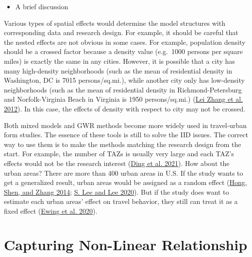 \documentclass[
  11pt,
  openany]{memoir}
\providecommand{\tightlist}{%
  \setlength{\itemsep}{0pt}\setlength{\parskip}{0pt}}
\begin{document}
\begin{itemize}
\tightlist
\item
  A brief discussion
\end{itemize}

Various types of spatial effects would determine the model structures with corresponding data and research design.
For example, it should be careful that the nested effects are not obvious in some cases.
For example, population density should be a crossed factor because a density value (e.g.~1000 persons per square miles) is exactly the same in any cities.
However, it is possible that a city has many high-density neighborhoods (such as the mean of residential density in Washington, DC is 7015 persons/sq.mi.), while another city only has low-density neighborhoods (such as the mean of residential density in Richmond-Petersburg and Norfolk-Virginia Beach in Virginia is 1950 persons/sq.mi.) (\protect\hyperlink{ref-zhangHowBuiltEnvironment2012}{Lei Zhang et al. 2012}).
In this case, the effects of density with respect to city may not be crossed.

Both mixed models and GWR methods become more widely used in travel-urban form studies. The essence of these tools is still to solve the IID issues. The correct way to use them is to make the methods matching the research design from the start. For example, the number of TAZs is usually very large and each TAZ's effects would not be the research interest (\protect\hyperlink{ref-dingNonlinearAssociationsZonal2021}{Ding et al. 2021}).
How about the urban areas? There are more than 400 urban areas in U.S.
If the study wants to get a generalized result, urban areas would be assigned as a random effect (\protect\hyperlink{ref-hongHowBuiltenvironmentFactors2014}{Hong, Shen, and Zhang 2014}; \protect\hyperlink{ref-leeComparingImpactsLocal2020}{S. Lee and Lee 2020}).
But if the study does want to estimate each urban areas' effect on travel behavior, they still can treat it as a fixed effect (\protect\hyperlink{ref-ewingReducingVehicleMiles2020}{Ewing et al. 2020}).

\hypertarget{capturing-non-linear-relationship}{%
\section{Capturing Non-Linear Relationship}\label{capturing-non-linear-relationship}}
\end{document}
